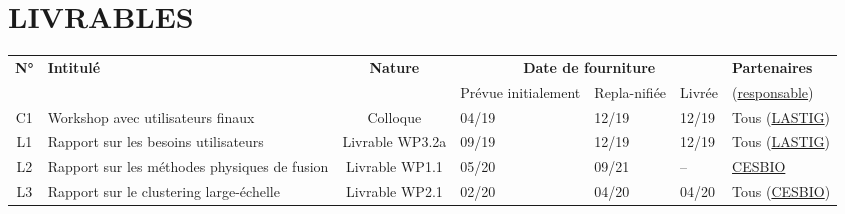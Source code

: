 \section{LIVRABLES}
\label{sec:livrables}



\begin{table}[htbp]
\small
    \centering
    \begin{tabular}{|c|p{4.75cm}|c|p{1.25cm}|p{1.25cm}|p{1.25cm}|p{2.55cm}|}
    \hline
\multirow{2}{*}{\textbf{N°}} & \multirow{2}{*}{\textbf{Intitulé}} & \multirow{2}{*}{\textbf{Nature}} & \multicolumn{3}{|c|}{\textbf{Date de fourniture}} & \textbf{Partenaires}\\\cline{4-6}
 & & & Prévue initialement & Repla-nifiée & Livrée & (\underline{responsable}) \\
\hline

C1 &Workshop avec utilisateurs finaux & Colloque  &04/19 &12/19 &12/19 & Tous (\underline{LASTIG}) \\
\hline \hline
L1 & Rapport sur les besoins utilisateurs & Livrable WP3.2a  &09/19 & 12/19 & 12/19 & Tous (\underline{LASTIG}) \\
\hline
L2 & Rapport sur les méthodes physiques de fusion & Livrable WP1.1  &05/20 &09/21 & -- & \underline{CESBIO} \\
\hline
L3 & Rapport sur le clustering large-échelle & Livrable WP2.1  &02/20 & 04/20 & 04/20 & Tous (\underline{CESBIO}) \\
\hline
    \end{tabular}
    \label{tab:my_label}
\end{table}